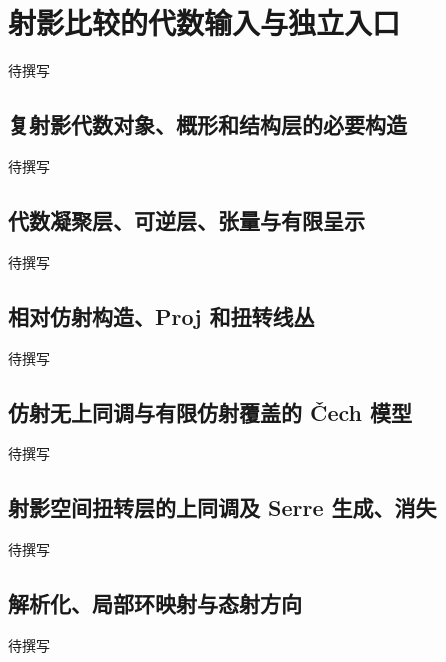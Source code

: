 
% 
% 
% 
% 
% 
% 
% 
% 
% 
% 
% 
% 

\section{射影比较的代数输入与独立入口}
\label{g4:sec:2001}

待撰写

\subsection{复射影代数对象、概形和结构层的必要构造}
\label{g4:subsec:2001:01}
待撰写

\subsection{代数凝聚层、可逆层、张量与有限呈示}
\label{g4:subsec:2001:02}
待撰写

\subsection{相对仿射构造、Proj 和扭转线丛}
\label{g4:subsec:2001:03}
待撰写

\subsection{仿射无上同调与有限仿射覆盖的 Čech 模型}
\label{g4:subsec:2001:04}
待撰写

\subsection{射影空间扭转层的上同调及 Serre 生成、消失}
\label{g4:subsec:2001:05}
待撰写

\subsection{解析化、局部环映射与态射方向}
\label{g4:subsec:2001:06}
待撰写
